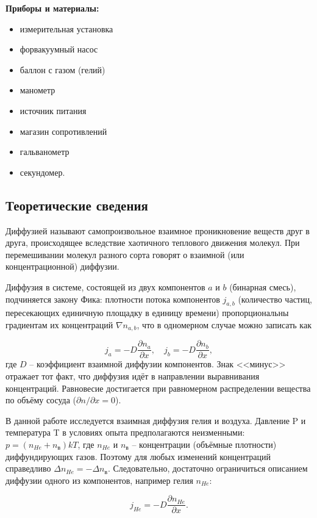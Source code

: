 \documentclass[12pt,a4paper]{article}
\begin{document}
\textbf{Приборы и материалы:} 
\begin {itemize} 
\item измерительная установка
\item форвакуумный насос
\item баллон с газом (гелий)
\item манометр
\item источник питания
\item магазин сопротивлений
\item гальванометр
\item секундомер.
\end{itemize}

\subsection{Теоретические сведения}

Диффузией называют самопроизвольное взаимное проникновение веществ друг в друга, происходящее вследствие хаотичного теплового движения молекул. При перемешивании молекул разного сорта говорят о взаимной (или концентрационной) диффузии.

Диффузия в системе, состоящей из двух компонентов $ a $ и $ b $ (бинарная смесь), подчиняется закону Фика: плотности потока компонентов $ j_{a,b} $ (количество частиц, пересекающих единичную площадку в единицу времени) пропорциональны градиентам их концентраций $ \nabla n_{a,b}$, что в одномерном случае можно записать как

\[ j_a = -D\frac{\partial n_a}{\partial x}, \quad j_b = -D\frac{\partial n_b}{\partial x}, \]
где $ D $ -- коэффициент взаимной диффузии компонентов. Знак <<минус>> отражает тот факт, что диффузия идёт в направлении выравнивания концентраций. Равновесие достигается при равномерном распределении вещества по объёму сосуда ($ \partial n / \partial x = 0 $).

В данной работе исследуется взаимная диффузия гелия и воздуха. Давление P и температура T в условиях опыта предполагаются неизменными: $ p=(n_{He}+n_{\text{в}})kT $, где $ n_{He} $ и $ n_{\text{в}} $ -- концентрации (объёмные плотности) диффундирующих газов. Поэтому для любых изменений концентраций справедливо $ \Delta n_{He}=-\Delta n_{\text{в}} $. Следовательно, достаточно ограничиться описанием диффузии одного из компонентов, например гелия $ n_{He} $:

\begin{equation}
j_{He}=-D\frac{\partial n_{He}}{\partial x}.
\end{equation}
\end{document}
